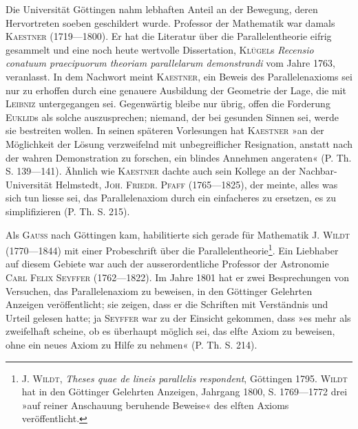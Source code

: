 \clearpage{}\setcounter{footnote}{0}
\noindent\hspace*{\parindent}Die Universität Göttingen nahm lebhaften Anteil an der Bewegung, deren
Hervortreten soeben geschildert wurde. Professor der Mathematik war damals
\textsc{Kaestner} (1719—1800). Er hat die Literatur über die Parallelentheorie eifrig
gesammelt und eine noch heute wertvolle Dissertation, \textsc{Klügel}s \textit{Recensio conatuum
praecipuorum theoriam parallelarum demonstrandi} vom Jahre 1763, veranlasst.
In dem Nachwort meint \textsc{Kaestner}, ein Beweis des Parallelenaxioms
sei nur zu erhoffen durch eine genauere Ausbildung der Geometrie der Lage,
die mit \textsc{Leibniz} untergegangen sei. Gegenwärtig bleibe nur übrig, offen die
Forderung \textsc{Euklid}s als solche auszusprechen; niemand, der bei gesunden Sinnen
sei, werde sie bestreiten wollen. In seinen späteren Vorlesungen hat \textsc{Kaestner}
»an der Möglichkeit der Lösung verzweifelnd mit unbegreiflicher Resignation,
anstatt nach der wahren Demonstration zu forschen, ein blindes Annehmen
angeraten« (P. Th. S. 139—141). Ähnlich wie \textsc{Kaestner} dachte auch
sein Kollege an der Nachbar-Universität Helmstedt, \textsc{Joh. Friedr. Pfaff} (1765—1825),
der meinte, alles was sich tun liesse sei, das Parallelenaxiom durch ein
einfacheres zu ersetzen, es zu simplifizieren (P. Th. S. 215).
\par
Als \textsc{Gauss} nach Göttingen kam, habilitierte sich gerade für Mathematik
J. \textsc{Wildt} (1770—1844) mit einer Probeschrift über die Parallelentheorie\footnote{J. \textsc{Wildt}, \textit{Theses quae de lineis parallelis respondent}, Göttingen 1795. \textsc{Wildt} hat in den Göttinger Gelehrten Anzeigen, Jahrgang 1800, S. 1769—1772 drei »auf reiner Anschauung beruhende Beweise« des elften Axioms veröffentlicht.}.
Ein Liebhaber auf diesem Gebiete war auch der ausserordentliche Professor
der Astronomie \textsc{Carl Felix Seyffer} (1762—1822). Im Jahre 1801 hat er
zwei Besprechungen von Versuchen, das Parallelenaxiom zu beweisen, in den
Göttinger Gelehrten Anzeigen veröffentlicht; sie zeigen, dass er die Schriften
mit Verständnis und Urteil gelesen hatte; ja \textsc{Seyffer} war zu der Einsicht
\clearpage{}\setcounter{footnote}{0}
\noindent gekommen, dass »es mehr als zweifelhaft scheine, ob es überhaupt möglich
sei, das elfte Axiom zu beweisen, ohne ein neues Axiom zu Hilfe zu nehmen«
(P. Th. S. 214).
\par
